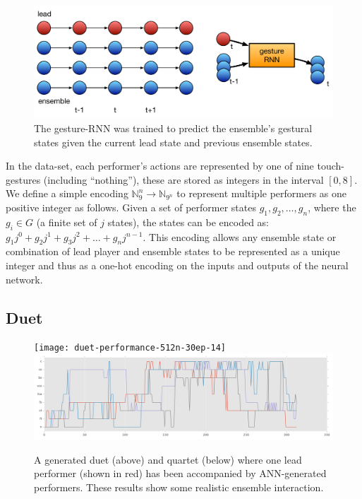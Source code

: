 \documentclass[sigchi]{acmart} %
\begin{document}
\begin{figure}
  \includegraphics[width=\columnwidth]{nn-ensemble-training}
  \caption{The gesture-RNN was trained to predict the ensemble's
    gestural states given the current lead state and previous ensemble
    states.}\label{fig:nn-ensemble-training}
\end{figure}

In the data-set, each performer's actions are represented by one of
nine touch-gestures (including ``nothing''), these are stored as
integers in the interval $[0,8]$. We define a simple encoding
$\mathbb{N}_{9}^n \rightarrow \mathbb{N}_{9^n}$ to represent multiple
performers as one positive integer as follows. Given a set of
performer states $g_1, g_2, \ldots, g_n$, where the $g_i \in G$ (a
finite set of $j$ states), the states can be encoded as:
$ g_1j^0 + g_2j^1 + g_3j^2 + \ldots + g_nj^{n-1} $.
This encoding allows any ensemble state or combination of lead player
and ensemble states to be represented as a unique integer and thus as
a one-hot encoding on the inputs and outputs of the neural network.

\subsection{Duet}

\begin{figure}
  \centering
  \texttt{[image: duet-performance-512n-30ep-14]}
  \includegraphics[width=\columnwidth]{quartet-performance-512nodes-16}
  \caption{A generated duet (above) and quartet (below) where one lead
    performer (shown in red) has been accompanied by ANN-generated
    performers. These results
    show some realistic ensemble interaction.}\label{fig:model-examples}
\end{figure}
\end{document}
